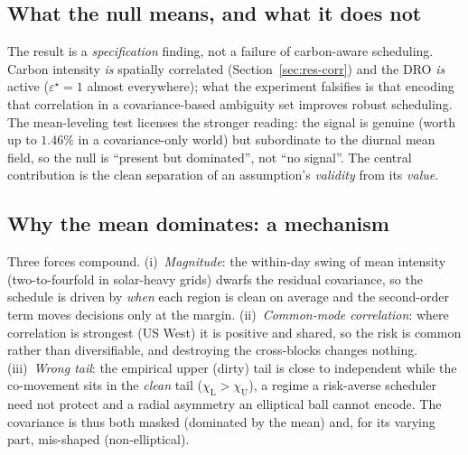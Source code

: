 \documentclass[12pt]{article}
\newcommand{\chiU}{\chi_{\mathrm{U}}}
\newcommand{\chiL}{\chi_{\mathrm{L}}}
\begin{document}
\subsection{What the null means, and what it does not}
The result is a \emph{specification} finding, not a failure of carbon-aware scheduling.
Carbon intensity \emph{is} spatially correlated (Section~\ref{sec:res-corr}) and the DRO
\emph{is} active ($\varepsilon^\star=1$ almost everywhere); what the experiment falsifies is
that encoding that correlation in a covariance-based ambiguity set improves robust
scheduling. The mean-leveling test licenses the stronger reading: the signal is genuine
(worth up to $1.46\%$ in a covariance-only world) but subordinate to the diurnal mean
field, so the null is ``present but dominated'', not ``no signal''. The central
contribution is the clean separation of an assumption's \emph{validity} from its
\emph{value}.

\subsection{Why the mean dominates: a mechanism}\label{sec:res-mech}
Three forces compound. (i)~\emph{Magnitude}: the within-day swing of mean intensity
(two-to-fourfold in solar-heavy grids) dwarfs the residual covariance, so the schedule is
driven by \emph{when} each region is clean on average and the second-order term moves
decisions only at the margin. (ii)~\emph{Common-mode correlation}: where correlation is
strongest (US West) it is positive and shared, so the risk is common rather than
diversifiable, and destroying the cross-blocks changes nothing. (iii)~\emph{Wrong tail}:
the empirical upper (dirty) tail is close to independent while the co-movement sits in the
\emph{clean} tail ($\chiL>\chiU$), a regime a risk-averse scheduler need not protect and a
radial asymmetry an elliptical ball cannot encode. The covariance is thus both masked
(dominated by the mean) and, for its varying part, mis-shaped (non-elliptical).
\end{document}
